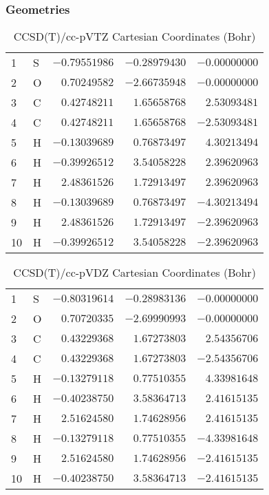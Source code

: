 \documentclass[10pt,oneside]{article}
\begin{document}
\clearpage

\subsection{\ \ \ }

\subsubsection*{Geometries}
\begin{table}[h!]
\centering
\caption{CCSD(T)/cc-pVTZ Cartesian Coordinates (Bohr)}
\begin{tabular}{llrrr}
1  & S  & $-0.79551986$ & $-0.28979430$ & $-0.00000000$ \\
2  & O  & $ 0.70249582$ & $-2.66735948$ & $-0.00000000$ \\
3  & C  & $ 0.42748211$ & $ 1.65658768$ & $ 2.53093481$ \\
4  & C  & $ 0.42748211$ & $ 1.65658768$ & $-2.53093481$ \\
5  & H  & $-0.13039689$ & $ 0.76873497$ & $ 4.30213494$ \\
6  & H  & $-0.39926512$ & $ 3.54058228$ & $ 2.39620963$ \\
7  & H  & $ 2.48361526$ & $ 1.72913497$ & $ 2.39620963$ \\
8  & H  & $-0.13039689$ & $ 0.76873497$ & $-4.30213494$ \\
9  & H  & $ 2.48361526$ & $ 1.72913497$ & $-2.39620963$ \\
10 & H  & $-0.39926512$ & $ 3.54058228$ & $-2.39620963$ \\
\end{tabular}
\end{table}

\begin{table}[h!]
\centering
\caption{CCSD(T)/cc-pVDZ Cartesian Coordinates (Bohr)}
\begin{tabular}{llrrr}
1  & S  & $-0.80319614$ & $-0.28983136$ & $-0.00000000$ \\
2  & O  & $ 0.70720335$ & $-2.69990993$ & $-0.00000000$ \\
3  & C  & $ 0.43229368$ & $ 1.67273803$ & $ 2.54356706$ \\
4  & C  & $ 0.43229368$ & $ 1.67273803$ & $-2.54356706$ \\
5  & H  & $-0.13279118$ & $ 0.77510355$ & $ 4.33981648$ \\
6  & H  & $-0.40238750$ & $ 3.58364713$ & $ 2.41615135$ \\
7  & H  & $ 2.51624580$ & $ 1.74628956$ & $ 2.41615135$ \\
8  & H  & $-0.13279118$ & $ 0.77510355$ & $-4.33981648$ \\
9  & H  & $ 2.51624580$ & $ 1.74628956$ & $-2.41615135$ \\
10 & H  & $-0.40238750$ & $ 3.58364713$ & $-2.41615135$ \\
\end{tabular}
\end{table}
\end{document}
